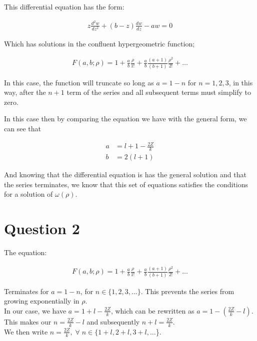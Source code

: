 \documentclass{article}
\begin{document}
    This differential equation has the form:

    \begin{gather}
        z\frac{d^2w}{dz^2} + (b-z)\frac{dw}{dz} - aw = 0
    \end{gather}

    Which has solutions in the confluent hypergeometric function;

    \begin{gather}
        F(a,b;\rho) = 1 + \frac{a}{b}\frac{\rho}{1!} + \frac{a}{b}\frac{(a+1)}{(b+1)}\frac{\rho^2}{2!} + \dots
    \end{gather}
    
    In this case, the function will truncate so long as $a=1-n$ for $n=1,2,3$,
    in this way, after the $n+1$ term of the series and all subsequent terms must simplify to zero.

    In this case then by comparing the equation we have with the general form, we can see that

    \begin{align}
        a &= l+1 - \frac{2Z}{k}\\
        b &= 2(l+1)
    \end{align}

    And knowing that the differential equation is has the general solution and that the series terminates, we know that this set of
    equations satisfies the conditions for a solution of $\omega(\rho)$.



\section{Question 2}

    The equation:

    \begin{gather}
        F(a,b;\rho) = 1 + \frac{a}{b}\frac{\rho}{1!} + \frac{a}{b}\frac{(a+1)}{(b+1)}\frac{\rho^2}{2!} + \dots
    \end{gather}

    Terminates for $a = 1 - n$, for $n \in \{1,2,3,\dots\}$. 
    This prevents the series from growing exponentially in $\rho$.\\

    In our case, we have $a = 1 + l - \frac{2Z}{k}$, which can be rewritten as $a = 1 - (\frac{2Z}{k}-l)$.\\
    This makes our $n = \frac{2Z}{k}-l$ and subsequently $n+l=\frac{2Z}{k}$.\\ 
    \smallskip
    We then write $n=\frac{2Z}{k}, \;\forall\; n \in \{1 + l, 2 + l, 3 + l, \dots$\}.\\
\end{document}

